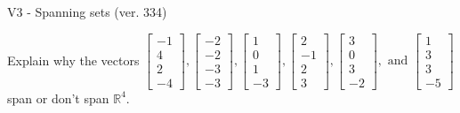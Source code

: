 \begin{exercise}
  \begin{exerciseTitle}V3 - Spanning sets (ver. 334)\end{exerciseTitle}
  \begin{exerciseStatement}
    Explain why the vectors \(\left[\begin{array}{r}
-1 \\
4 \\
2 \\
-4
\end{array}\right] , \left[\begin{array}{r}
-2 \\
-2 \\
-3 \\
-3
\end{array}\right] , \left[\begin{array}{r}
1 \\
0 \\
1 \\
-3
\end{array}\right] , \left[\begin{array}{r}
2 \\
-1 \\
2 \\
3
\end{array}\right] , \left[\begin{array}{r}
3 \\
0 \\
3 \\
-2
\end{array}\right] , \text{ and } \left[\begin{array}{r}
1 \\
3 \\
3 \\
-5
\end{array}\right]\) span or don't span \(\mathbb{R}^4\). 
	



\end{exerciseStatement}
\end{exercise}
